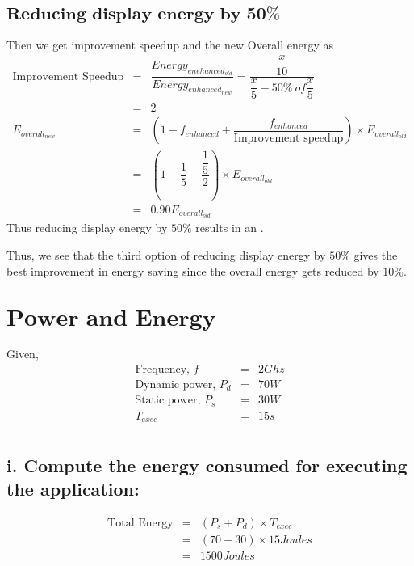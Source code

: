 \documentclass{tufte-handout}
\begin{document}
	  \subsection{$\textbf{Reducing display energy by 50\%}$}
	  	Then we get improvement speedup and the new Overall energy as
		\begin{eqnarray*}
			\mbox{Improvement Speedup} &=& \dfrac{Energy_{enehanced_{old}}}{Energy_{enhanced_{new}}} = \dfrac{\dfrac{x}{10}}{\dfrac{x}{5} - 50\%\ of \dfrac{x}{5}}\\
			&=& 2 \\
			E_{overall_{new}} &=& (1 - f_{enhanced} + \dfrac{f_{enhanced}}{\mbox{Improvement speedup}}) \times E_{overall_{old}} \\
			&=& ( 1 - \dfrac{1}{5} + \dfrac{\dfrac{1}{5}}{2})\times E_{overall_{old}} \\
			&=& 0.90 E_{overall_{old}}
		\end{eqnarray*}
		Thus reducing display energy by $50\%$ results in an .

		Thus, we see that the third option of reducing display energy by $50\%$ gives the best improvement in energy saving since the overall energy gets reduced by $10\%$.


\newpage
\section{$\textbf{Power and Energy}$}
	Given,
	\begin{eqnarray*}
		\mbox{Frequency, } f &=& 2Ghz \\
		\mbox{Dynamic power, } P_d &=& 70 W \\
		\mbox{Static power, } P_s &=& 30 W \\
		T_{exec} &=& 15 s \\
	\end{eqnarray*}

	\subsection{i. Compute the energy consumed for executing the application:}
		\begin{eqnarray*}
			\mbox{Total Energy} &=& (P_s + P_d)\times T_{exec} \\
			&=& (70 + 30) \times 15 Joules \\
			&=& 1500 Joules
		\end{eqnarray*}

\end{document}
